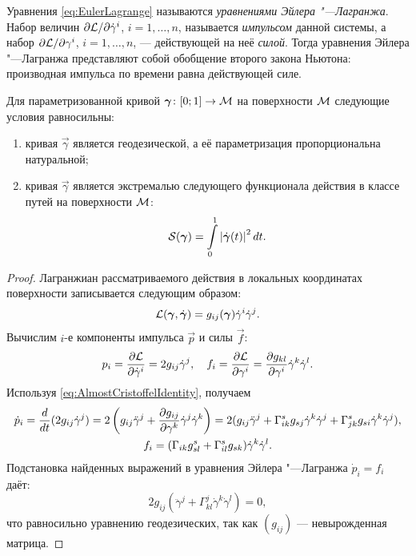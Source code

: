 Уравнения \eqref{eq:EulerLagrange} называются \textit{уравнениями Эйлера "---Лагранжа}. Набор величин $\partial\mathcal{L} / \partial\dot{\gamma}^i$, $i = 1, \ldots, n$, называется \textit{импульсом} данной системы, а набор $\partial\mathcal{L} / \partial\gamma^i$, $i = 1, \ldots, n$, --- действующей на неё \textit{силой}. Тогда уравнения Эйлера "---Лагранжа представляют собой обобщение второго закона Ньютона: производная импульса по времени равна действующей силе.

\begin{theorem}
	Для параметризованной кривой $\boldsymbol{\gamma}\colon [0; 1] \to \mathcal{M}$ на поверхности $\mathcal{M}$ следующие условия равносильны:
	\begin{enumerate}[nolistsep, label=(\arabic*)]
		\item кривая $\vec{\gamma}$ является геодезической, а её параметризация пропорциональна натуральной;
		\item кривая $\vec{\gamma}$ является экстремалью следующего функционала действия в классе путей на поверхности $\mathcal{M}$:
			\[
				\mathcal{S}(\boldsymbol{\gamma}) = \int\limits_0^1\left\lvert\dot{\boldsymbol{\gamma}}(t)\right\rvert^2dt.
			\]
	\end{enumerate}
\end{theorem}

\begin{proof}
	Лагранжиан рассматриваемого действия в локальных координатах поверхности записывается следующим образом:
	\[
		\mathcal{L}(\boldsymbol{\gamma}, \dot{\boldsymbol{\gamma}}) = g_{ij}(\boldsymbol{\gamma})\dot{\gamma}^i\dot{\gamma}^j.
	\]
	Вычислим $i$-е компоненты импульса $\vec{p}$ и силы $\vec{f}$:
	\[
		p_i = \frac{\partial\mathcal{L}}{\partial\dot{\gamma}^i} = 2g_{ij}\dot{\gamma}^j,\quad f_i = \frac{\partial\mathcal{L}}{\partial\gamma^i} = \frac{\partial g_{kl}}{\partial\gamma^i}\dot{\gamma}^k\dot{\gamma}^l.
	\]
	Используя \eqref{eq:AlmostCristoffelIdentity}, получаем
	\begin{gather*}
		\dot{p}_i = \frac{d}{dt}(2g_{ij}\dot{\gamma}^j) = 2\left(g_{ij}\ddot{\gamma}^j + \frac{\partial g_{ij}}{\partial\gamma^k}\dot{\gamma}^j\dot{\gamma}^k\right) = 2(g_{ij}\ddot{\gamma}^j + \Gamma_{ik}^sg_{sj}\dot{\gamma}^k\dot{\gamma}^j + \Gamma_{jk}^sg_{si}\dot{\gamma}^k\dot{\gamma}^j),\\
		f_i =(\Gamma_{ik}g_{sl}^s + \Gamma_{il}^sg_{sk})\dot{\gamma}^k\dot{\gamma}^l.
	\end{gather*}
	Подстановка найденных выражений в уравнения Эйлера "---Лагранжа $\dot{p}_i = f_i$ даёт:
	\[
		2g_{ij}(\ddot{\gamma}^j + \Gamma_{kl}^j\dot{\gamma}^k\dot{\gamma}^l) = 0,
	\]
	что равносильно уравнению геодезических, так как $(g_{ij})$ --- невырожденная матрица.
\end{proof}

